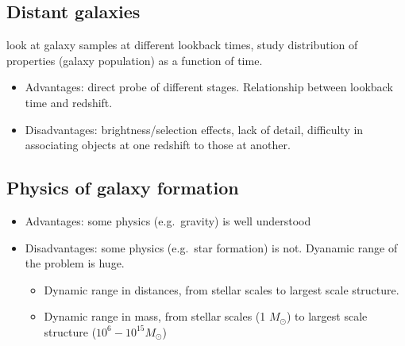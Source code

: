 \documentclass{article}
\begin{document}
\subsection{Distant galaxies}
look at galaxy samples at different lookback
times, study distribution of properties (galaxy population) as
a function of time.
\begin{itemize}
    \item Advantages: direct probe of different stages.
        Relationship between lookback time and redshift.
    \item Disadvantages: brightness/selection effects, lack
        of detail, difficulty in associating objects at one redshift
                    to those at another.
\end{itemize}
\subsection{Physics of galaxy formation}
\begin{itemize}
    \item Advantages: some physics (e.g.\ gravity) is well
        understood
    \item Disadvantages: some physics (e.g.\ star formation)
        is not. Dyanamic range of the problem is huge.
        \begin{itemize}
            \item Dynamic range in distances, from stellar scales
                to largest scale structure.
            \item Dynamic range in mass, from stellar scales
                (1 $M_{\odot}$) to
                largest scale structure ($10^6-10^{15} M_{\odot}$)
        \end{itemize}
\end{itemize}
\end{document}
